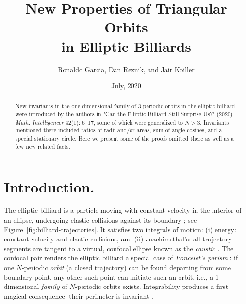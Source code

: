\documentclass{article}
\theoremstyle{definition}
\begin{document}
\title{New Properties of Triangular Orbits\\in Elliptic Billiards}
\date{July, 2020}


 \author{Ronaldo Garcia, Dan Reznik, and Jair Koiller}

\maketitle

\begin{abstract}
New invariants in the one-dimensional family of 3-periodic orbits in the elliptic billiard were introduced by the authors in "Can the Elliptic Billiard Still Surprise Us?"  (2020) \textit{Math. Intelligencer} 42(1): 6--17, some of which were generalized to $N>3$. Invariants mentioned there included ratios of radii and/or areas, sum of angle cosines, and a special stationary circle. Here we present some of the proofs omitted there as well as a few new related facts. \\
\end{abstract}

\section{Introduction.}
\label{sec:intro}
The elliptic billiard is a particle moving with constant velocity in the interior of an ellipse, undergoing elastic collisions against its boundary \cite{rozikov2018,sergei91}; see Figure~\ref{fig:billiard-trajectories}. It satisfies two integrals of motion: (i) energy: constant velocity and elastic collisions, and (ii) Joachimsthal's: all trajectory segments are tangent to a virtual, confocal ellipse known as the {\em caustic} \cite{sergei91}. The confocal pair renders the elliptic billiard a special case of {\em Poncelet's porism} \cite{dragovic11}: if one $N$-periodic {\em orbit} (a closed trajectory) can be found departing from some boundary point, any other such point can initiate such an orbit, i.e., a 1-dimensional {\em family} of $N$-periodic orbits exists. Integrability produces a first magical consequence: their perimeter is invariant \cite{sergei91}. 
\end{document}
